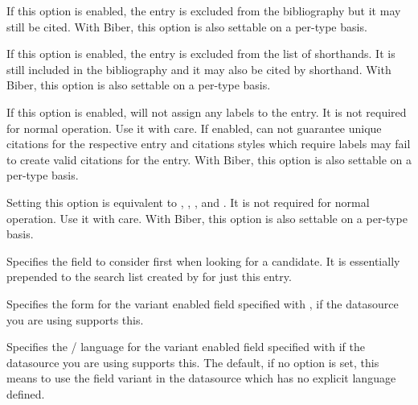 \documentclass{ltxdockit}[2011/03/25]
\newcommand*{\biber}{Biber\xspace}
\begin{document}
\begin{optionlist}


If this option is enabled, the entry is excluded from the bibliography but it may still be cited.
\BiberOnlyMark With \biber, this option is also settable on a per-type basis.


If this option is enabled, the entry is excluded from the list of shorthands. It is still included in the bibliography and it may also be cited by shorthand.
\BiberOnlyMark With \biber, this option is also settable on a per-type basis.


If this option is enabled,  will not assign any labels to the entry. It is not required for normal operation. Use it with care. If enabled,  can not guarantee unique citations for the respective entry and citations styles which require labels may fail to create valid citations for the entry.
\BiberOnlyMark With \biber, this option is also settable on a per-type basis.


Setting this option is equivalent to , , , and . It is not required for normal operation. Use it with care.
\BiberOnlyMark With \biber, this option is also settable on a per-type basis.


Specifies the field to consider first when looking for a  candidate. It is essentially prepended to the search list created by  for just this entry.


Specifies the form for the variant enabled field specified with , if the datasource you are using supports this.


Specifies the / language for the variant enabled field specified with  if the datasource you are using supports this. The default, if no  option is set, this means to use the field variant in the datasource which has no explicit language defined.


\end{optionlist}
\end{document}
